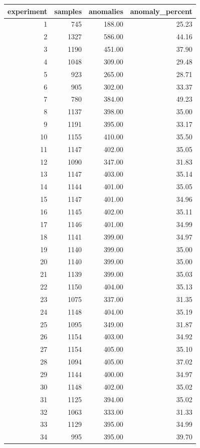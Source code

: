 \begin{tabular}{rrrr}
\toprule
experiment & samples & anomalies & anomaly_percent \\
\midrule
1 & 745 & 188.00 & 25.23 \\
2 & 1327 & 586.00 & 44.16 \\
3 & 1190 & 451.00 & 37.90 \\
4 & 1048 & 309.00 & 29.48 \\
5 & 923 & 265.00 & 28.71 \\
6 & 905 & 302.00 & 33.37 \\
7 & 780 & 384.00 & 49.23 \\
8 & 1137 & 398.00 & 35.00 \\
9 & 1191 & 395.00 & 33.17 \\
10 & 1155 & 410.00 & 35.50 \\
11 & 1147 & 402.00 & 35.05 \\
12 & 1090 & 347.00 & 31.83 \\
13 & 1147 & 403.00 & 35.14 \\
14 & 1144 & 401.00 & 35.05 \\
15 & 1147 & 401.00 & 34.96 \\
16 & 1145 & 402.00 & 35.11 \\
17 & 1146 & 401.00 & 34.99 \\
18 & 1141 & 399.00 & 34.97 \\
19 & 1140 & 399.00 & 35.00 \\
20 & 1140 & 399.00 & 35.00 \\
21 & 1139 & 399.00 & 35.03 \\
22 & 1150 & 404.00 & 35.13 \\
23 & 1075 & 337.00 & 31.35 \\
24 & 1148 & 404.00 & 35.19 \\
25 & 1095 & 349.00 & 31.87 \\
26 & 1154 & 403.00 & 34.92 \\
27 & 1154 & 405.00 & 35.10 \\
28 & 1094 & 405.00 & 37.02 \\
29 & 1144 & 400.00 & 34.97 \\
30 & 1148 & 402.00 & 35.02 \\
31 & 1125 & 394.00 & 35.02 \\
32 & 1063 & 333.00 & 31.33 \\
33 & 1129 & 395.00 & 34.99 \\
34 & 995 & 395.00 & 39.70 \\
\bottomrule
\end{tabular}
